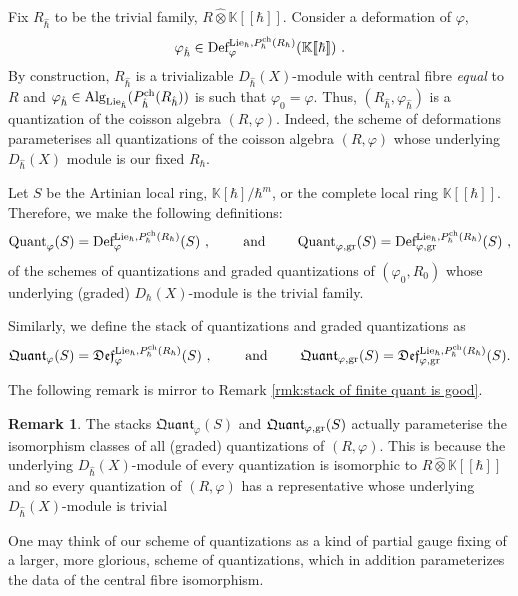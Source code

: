 \documentclass[11pt]{amsart}
\numberwithin{equation}{section}
\theoremstyle{definition}
\newtheorem{rmk}[theo]{Remark}
\newcommand{\bb}{\mathbb}
\newcommand{\Def}{{\textup{Def}}}
\newcommand{\fDef}{{\mathfrak{Def}}}
\newcommand{\fph}{{[\![\hbar]\!]}}
\newcommand{\gd}{{\textup{gr}}}
\newcommand{\ik}{{\bb K}}
\newcommand{\Quant}{{\textup{Quant}}}
\newcommand{\fQuant}{{\mathfrak{Quant}}}
\newcommand{\Alg}{{\textup{Alg}}}
\newcommand{\Lie}{{\textup{Lie}}}
\newcommand{\ch}{{\textup{ch}}}
\newcommand{\0}{{\textbf{0}}}
\def\ch{{\rm ch}}
\def \hhb{{\hat \hbar}}
\begin{document}
\subsubsection{} 

Fix $R_{\hat \hbar}$ to be the trivial family, $R \widehat{\otimes}\ik\fph$. Consider a deformation of $\varphi$,
\[
\varphi_{\hat \hbar}\in \Def_{\varphi}^{\Lie_\hbar,P^\ch_\hbar(R_\hbar)}(\ik\fph)~.
\]
By construction, $R_{\hat \hbar}$ is a trivializable $D_{\hat \hbar}(X)$-module with central fibre \emph{equal} to $R$ and $\varphi_{\hat \hbar}\in \Alg_{\Lie_{\hat \hbar}}(P^\ch_{\hat \hbar}(R_{\hat \hbar}))$ is such that $\varphi_0 = \varphi$. Thus, $(R_{\hat \hbar}, \varphi_{\hat \hbar})$ is a quantization of  the coisson algebra $(R,\varphi)$. Indeed, the scheme of deformations parameterises all quantizations of the coisson algebra $(R,\varphi)$ whose underlying $D_{\hat \hbar}(X)$ module is our fixed $R_\hbar$.

Let $S$ be the Artinian local ring, $ \ik[\hbar]/\hbar^m$, or the complete local ring $\ik\fph$.
Therefore, we make the following definitions:
\begin{equation}
	\Quant_\varphi(S) =\Def_\varphi^{\Lie_\hbar, P_\hbar^\ch(R_\hbar)}(S) ~, \qquad \text{ and } \qquad  \Quant_{\varphi,\gd}(S) =\Def_{\varphi,\gd}^{\Lie_{\hbar}, P^\ch_\hbar(R_\hbar)}(S)~,
\end{equation}
of the schemes of quantizations and graded quantizations of $(\varphi_0,R_0)$ whose underlying (graded) $D_\hbar(X)$-module is the trivial family.

Similarly, we define the stack of quantizations and graded quantizations as
\begin{equation}\label{eq:chiral quant defn}
	\fQuant_\varphi(S)  =\fDef_\varphi^{\Lie_\hbar, P^\ch_\hbar(R_\hbar)}(S)  ~, \qquad \text{ and } \qquad  \fQuant_{\varphi,\gd}(S)  =\fDef_{\varphi,\gd}^{\Lie_{\hbar}, P^\ch_\hbar(R_\hbar)}(S)   .
\end{equation}

The following remark is mirror to Remark \ref{rmk:stack of finite quant is good}.
\begin{rmk}
The stacks $\fQuant_\varphi(S)$ and $\fQuant_{\varphi,\gd}(S)$ actually parameterise the isomorphism classes of all (graded) quantizations of $(R,\varphi)$. This is because the underlying $D_\hhb(X)$-module of every quantization is isomorphic to $R\widehat{\otimes}\ik\fph$ and so every quantization of $(R,\varphi)$ has a representative whose underlying $D_\hhb(X)$-module is trivial

One may think of our scheme of quantizations as a kind of partial gauge fixing of a larger, more glorious, scheme of quantizations, which in addition parameterizes the data of the central fibre isomorphism.
\end{rmk}
\end{document}
